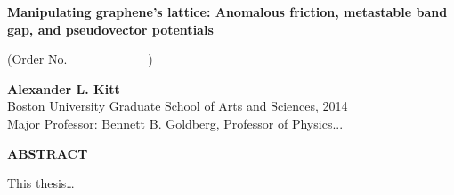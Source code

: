 \vspace{-0.2in}

\begin{center}

\textbf{Manipulating graphene's lattice: Anomalous friction, metastable band gap, and pseudovector potentials}\\

\vspace{0.2in}

(Order No.\ \ \ \ \ \ \ \ \ \ \ \ \ )\\

\vspace{0.2in}

\textbf{Alexander L. Kitt}\\
Boston University Graduate School of Arts and Sciences, 2014\\
Major Professor: Bennett B. Goldberg, Professor of Physics...\\

\vspace{0.4in}

\textbf{ABSTRACT}

\end{center}

\noindent
This thesis\ldots